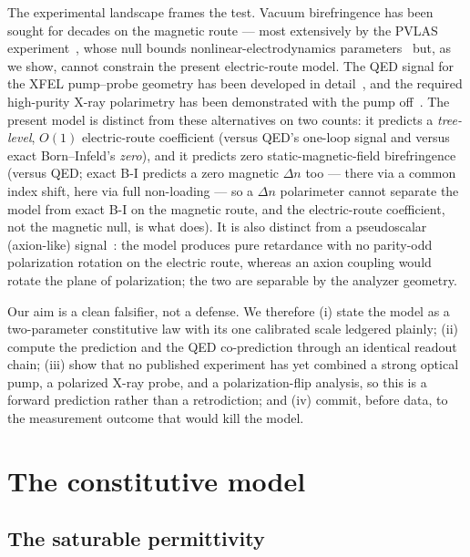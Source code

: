 \documentclass[aps,prd,twocolumn,superscriptaddress,nofootinbib,longbibliography]{revtex4-2}
\begin{document}
The experimental landscape frames the test. Vacuum birefringence has been sought
for decades on the magnetic route --- most extensively by the PVLAS
experiment~\cite{Ejlli2020}, whose null bounds nonlinear-electrodynamics
parameters~\cite{BattestiRizzo2013,Fouche2016} but, as we show, cannot constrain
the present electric-route model. The QED signal for the XFEL pump--probe geometry
has been developed in detail~\cite{Karbstein2015,Karbstein2021}, and the required
high-purity X-ray polarimetry has been demonstrated with the pump
off~\cite{Marx2013,Karbstein2021}. The present model is distinct from these
alternatives on two counts: it predicts a \emph{tree-level}, $O(1)$ electric-route
coefficient (versus QED's one-loop signal and versus exact Born--Infeld's
\emph{zero}), and it predicts zero static-magnetic-field birefringence (versus
QED; exact B-I predicts a zero magnetic $\Delta n$ too --- there via a common index
shift, here via full non-loading --- so a $\Delta n$ polarimeter cannot separate
the model from exact B-I on the magnetic route, and the electric-route coefficient,
not the magnetic null, is what does). It is also distinct from a pseudoscalar (axion-like)
signal~\cite{Fouche2016}: the model produces pure retardance with no parity-odd
polarization rotation on the electric route, whereas an axion coupling would rotate
the plane of polarization; the two are separable by the analyzer geometry.

Our aim is a clean falsifier, not a defense. We therefore (i) state the model
as a two-parameter constitutive law with its one calibrated scale ledgered
plainly; (ii) compute the prediction and the QED co-prediction through an
identical readout chain; (iii) show that no published experiment has yet
combined a strong optical pump, a polarized X-ray probe, and a polarization-flip
analysis, so this is a forward prediction rather than a retrodiction; and
(iv) commit, before data, to the measurement outcome that would kill the model.

\section{The constitutive model}
\label{sec:model}

\subsection{The saturable permittivity}
\end{document}
